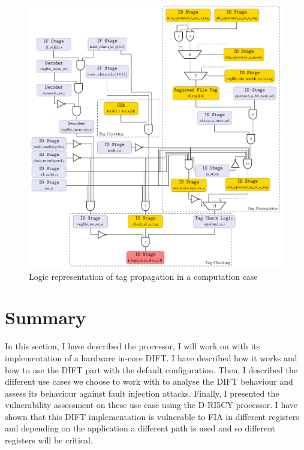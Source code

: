\begin{figure}[ht]
    \centering
    \includegraphics[width=\textwidth]{c3_vulnerabilities_assessment/img/comp_compu/arborescence_propagation.pdf}
    \caption{Logic representation of tag propagation in a computation case}
    \label{fig:attack_propag_v3_tag_propagation}
\end{figure}


\section{Summary}
In this section, I have described the processor, I will work on with its implementation of a hardware in-core DIFT. I have described how it works and how to use the DIFT part with the default configuration. Then, I described the different use cases we choose to work with to analyse the DIFT behaviour and assess its behaviour against fault injection attacks. Finally, I presented the vulnerability assessment on these use case using the D-RI5CY processor. I have shown that this DIFT implementation is vulnerable to FIA in different registers and depending on the application a different path is used and so different registers will be critical.
